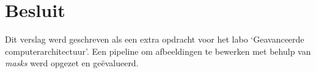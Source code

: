 \documentclass[twocolumn, a4paper]{article}
\begin{document}
\section{Besluit}
Dit verslag werd geschreven als een extra opdracht voor het labo `Geavanceerde computerarchitectuur'. Een pipeline om afbeeldingen te bewerken met behulp van \textit{masks} werd opgezet en ge\"evalueerd.

\onecolumn

\appendix




\newpage

\end{document}
